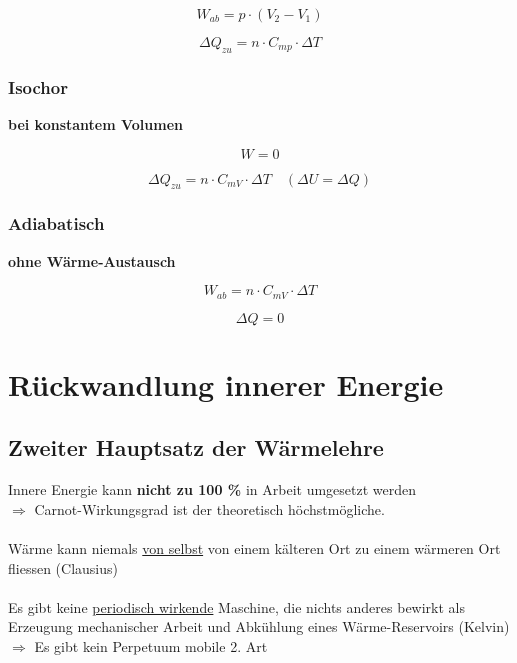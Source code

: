 \begin{minipage}{0.48\linewidth}
$$ \boxed{ W_{ab} = p \cdot (V_2 -V_1)  }  $$
\end{minipage}
\hfill
\begin{minipage}{0.48\linewidth}
$$ \boxed{ \Delta Q_{zu} = n \cdot C_{mp} \cdot \Delta T } $$
\end{minipage}


\subsubsection{Isochor}
\textbf{bei konstantem Volumen}

\begin{minipage}{0.4\linewidth}
$$ \boxed{ W = 0 }  $$
\end{minipage}
\hfill
\begin{minipage}{0.58\linewidth}
$$ \boxed{ \Delta Q_{zu} = n \cdot C_{mV} \cdot \Delta T }  \quad  (\Delta U = \Delta Q) $$
\end{minipage}


\subsubsection{Adiabatisch}
\textbf{ohne Wärme-Austausch} \\


\begin{minipage}{0.48\linewidth}
$$ \boxed{ W_{ab} = n \cdot C_{mV} \cdot \Delta T }  $$
\end{minipage}
\hfill
\begin{minipage}{0.48\linewidth}
$$ \boxed{ \Delta Q = 0} $$
\end{minipage}





\section{Rückwandlung innerer Energie}

\subsection{Zweiter Hauptsatz der Wärmelehre}
Innere Energie kann \textbf{nicht zu 100 \%} in Arbeit umgesetzt werden \\
$\Rightarrow$ Carnot-Wirkungsgrad ist der theoretisch höchstmögliche. \\
\\
Wärme kann niemals \underline{von selbst} von einem kälteren Ort zu einem wärmeren Ort fliessen (Clausius)\\
\\
Es gibt keine \underline{periodisch wirkende} Maschine, die nichts anderes bewirkt als Erzeugung mechanischer Arbeit und Abkühlung eines Wärme-Reservoirs (Kelvin) \\
$\Rightarrow$ Es gibt kein Perpetuum mobile 2. Art


